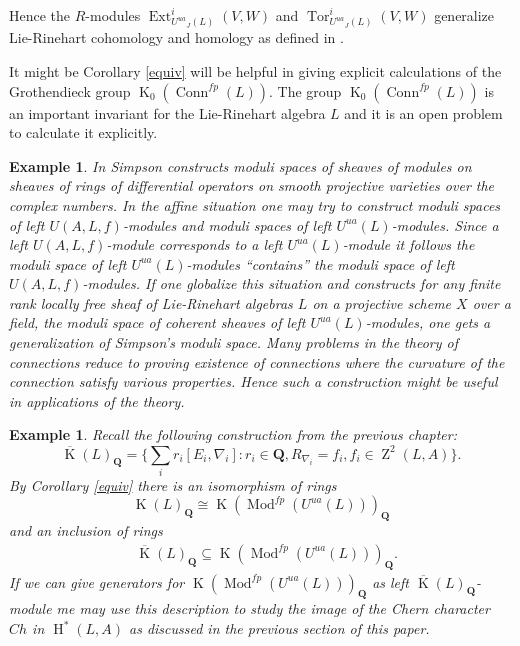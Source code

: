 \documentclass{amsart}
\theoremstyle{plain}
\newtheorem{example}[theorem]{Example}
\theoremstyle{definition}
\theoremstyle{remark}
\numberwithin{equation}{theorem}
\begin{document}
Hence the ${R}$-modules ${\operatorname{Ext} }^i_{{U^{ua}}_J(L)}(V,W)$ and ${\operatorname{Tor} }^i_{{U^{ua}}_J(L)}(V,W)$ generalize Lie-Rinehart cohomology and homology
as defined in \cite{rinehart}.

It might be Corollary \ref{equiv}
will be helpful in giving explicit calculations of the Grothendieck group ${\operatorname{K}}_0({\operatorname{Conn}}^{fp}(L))$. The group 
${\operatorname{K}}_0({\operatorname{Conn}}^{fp}(L))$ is an important invariant for the Lie-Rinehart algebra $L$ and it is an open problem to 
calculate it explicitly.

\begin{example} 

In \cite{simpson} Simpson constructs moduli spaces of sheaves of modules on sheaves of rings of differential operators
on smooth projective varieties over the complex numbers. In the affine situation one may try to construct
moduli spaces of left $U({A},L,f)$-modules and moduli spaces of left ${U^{ua}}(L)$-modules. Since a left $U({A},L,f)$-module corresponds
to a left ${U^{ua}}(L)$-module it follows the moduli space of left ${U^{ua}}(L)$-modules ``contains'' the moduli space of left
$U({A},L,f)$-modules. If one globalize this situation and constructs for any finite rank locally free sheaf of 
Lie-Rinehart algebras $L$ on a projective scheme $X$ over a field, the moduli space of coherent sheaves of left ${U^{ua}}(L)$-modules, one gets a generalization of Simpson's moduli space. Many problems in the theory of connections reduce to proving existence 
of connections where the curvature of the connection satisfy various properties. Hence such a construction 
might be useful in applications of the theory.
\end{example}

\begin{example} 

Recall the following construction from the previous chapter:
\[ \overline{\operatorname{K}}(L)_{\mathbf{Q}}=\{ \sum_i r_i[E_i,\nabla_i]: r_i\in \mathbf{Q}, R_{\nabla_i}=f_i, f_i\in {\operatorname{Z}}^2(L,{A})\}.\]
By Corollary \ref{equiv} there is an isomorphism of rings
\[ {\operatorname{K}}(L)_{\mathbf{Q}}\cong {\operatorname{K}}({\operatorname{Mod}}^{fp}({U^{ua}}(L)))_{\mathbf{Q}} \]
and an inclusion of rings
\begin{align}
&\label{cherncharacter} \overline{\operatorname{K}}(L)_{\mathbf{Q}} \subseteq {\operatorname{K}}({\operatorname{Mod}}^{fp}({U^{ua}}(L)))_{\mathbf{Q}}.
\end{align}
If we can give generators for ${\operatorname{K}}({\operatorname{Mod}}^{fp}({U^{ua}}(L)))_{\mathbf{Q}}$ as left $\overline{\operatorname{K}}(L)_{\mathbf{Q}}$-module
me may use this description to study the image of the Chern character $Ch$ in ${\operatorname{H} }^*(L,{A})$ as discussed
in the previous section of this paper.
\end{example}
\end{document}

